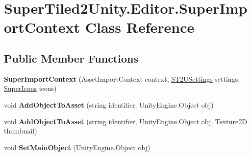 \hypertarget{class_super_tiled2_unity_1_1_editor_1_1_super_import_context}{}\section{Super\+Tiled2\+Unity.\+Editor.\+Super\+Import\+Context Class Reference}
\label{class_super_tiled2_unity_1_1_editor_1_1_super_import_context}
\subsection*{Public Member Functions}
\begin{DoxyCompactItemize}
\item 
\mbox{\label{class_super_tiled2_unity_1_1_editor_1_1_super_import_context_a6f42f81e1cf5d6b47eb5d1df4772c04d}} 
{\bfseries Super\+Import\+Context} (Asset\+Import\+Context context, \mbox{\hyperlink{class_super_tiled2_unity_1_1_editor_1_1_s_t2_u_settings}{S\+T2\+U\+Settings}} settings, \mbox{\hyperlink{class_super_tiled2_unity_1_1_editor_1_1_super_icons}{Super\+Icons}} icons)
\item 
\mbox{\label{class_super_tiled2_unity_1_1_editor_1_1_super_import_context_a363463d32f67ad16ad97aa64395002b7}} 
void {\bfseries Add\+Object\+To\+Asset} (string identifier, Unity\+Engine.\+Object obj)
\item 
\mbox{\label{class_super_tiled2_unity_1_1_editor_1_1_super_import_context_ae53db5bfa8358c360f305079109f6a4c}} 
void {\bfseries Add\+Object\+To\+Asset} (string identifier, Unity\+Engine.\+Object obj, Texture2D thumbnail)
\item 
\mbox{\label{class_super_tiled2_unity_1_1_editor_1_1_super_import_context_ae3ae3ea59e9c7aa8c8ee5e261fdead1a}} 
void {\bfseries Set\+Main\+Object} (Unity\+Engine.\+Object obj)
\item 
\mbox{\label{class_super_tiled2_unity_1_1_editor_1_1_super_import_context_ac6d4a851588c58763907686c48839382}} 

\end{DoxyCompactItemize}
